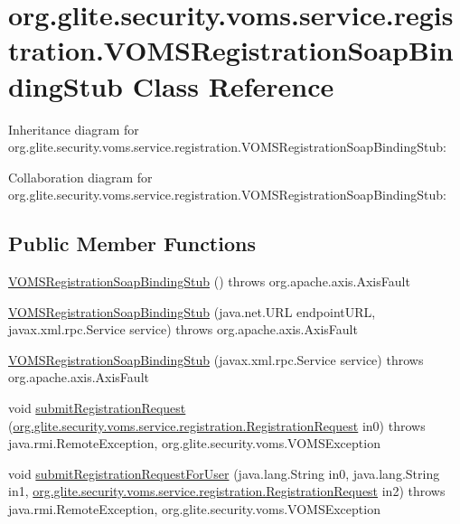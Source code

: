 \hypertarget{classorg_1_1glite_1_1security_1_1voms_1_1service_1_1registration_1_1VOMSRegistrationSoapBindingStub}{
\section{org.glite.security.voms.service.registration.VOMSRegistrationSoapBindingStub Class Reference}
\label{classorg_1_1glite_1_1security_1_1voms_1_1service_1_1registration_1_1VOMSRegistrationSoapBindingStub}
}


Inheritance diagram for org.glite.security.voms.service.registration.VOMSRegistrationSoapBindingStub:


Collaboration diagram for org.glite.security.voms.service.registration.VOMSRegistrationSoapBindingStub:
\subsection*{Public Member Functions}
\begin{DoxyCompactItemize}
\item 
\hyperlink{classorg_1_1glite_1_1security_1_1voms_1_1service_1_1registration_1_1VOMSRegistrationSoapBindingStub_ad8e2e83362c26eeed1bd37ad7ccbe9a3}{VOMSRegistrationSoapBindingStub} ()  throws org.apache.axis.AxisFault 
\item 
\hyperlink{classorg_1_1glite_1_1security_1_1voms_1_1service_1_1registration_1_1VOMSRegistrationSoapBindingStub_a2e1cda669537f726c5195eab57f632bd}{VOMSRegistrationSoapBindingStub} (java.net.URL endpointURL, javax.xml.rpc.Service service)  throws org.apache.axis.AxisFault 
\item 
\hyperlink{classorg_1_1glite_1_1security_1_1voms_1_1service_1_1registration_1_1VOMSRegistrationSoapBindingStub_a4a9e28d9238173977e98e934b3453899}{VOMSRegistrationSoapBindingStub} (javax.xml.rpc.Service service)  throws org.apache.axis.AxisFault 
\item 
void \hyperlink{classorg_1_1glite_1_1security_1_1voms_1_1service_1_1registration_1_1VOMSRegistrationSoapBindingStub_a33bfa5eb8f7b9cac6ea186788f047ced}{submitRegistrationRequest} (\hyperlink{classorg_1_1glite_1_1security_1_1voms_1_1service_1_1registration_1_1RegistrationRequest}{org.glite.security.voms.service.registration.RegistrationRequest} in0)  throws java.rmi.RemoteException, org.glite.security.voms.VOMSException 
\item 
void \hyperlink{classorg_1_1glite_1_1security_1_1voms_1_1service_1_1registration_1_1VOMSRegistrationSoapBindingStub_a317c0e341f3dbc7e3384801c4468f9e6}{submitRegistrationRequestForUser} (java.lang.String in0, java.lang.String in1, \hyperlink{classorg_1_1glite_1_1security_1_1voms_1_1service_1_1registration_1_1RegistrationRequest}{org.glite.security.voms.service.registration.RegistrationRequest} in2)  throws java.rmi.RemoteException, org.glite.security.voms.VOMSException 
\end{DoxyCompactItemize}
